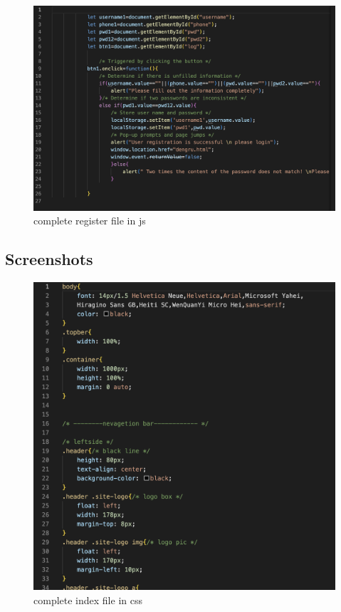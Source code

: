 \documentclass[a4paper, 11pt]{report}
\begin{document}
\begin{figure}
\includegraphics[width=1\linewidth]{register file javascript.png}
\caption{\label{register file javascript.png}complete register file in js}
\end{figure}

\newpage
\subsection{Screenshots}
\begin{figure}
\includegraphics[width=1\linewidth]{index file css.png}
\caption{\label{index file css.png}complete index file in css}
\end{figure}
\end{document}
